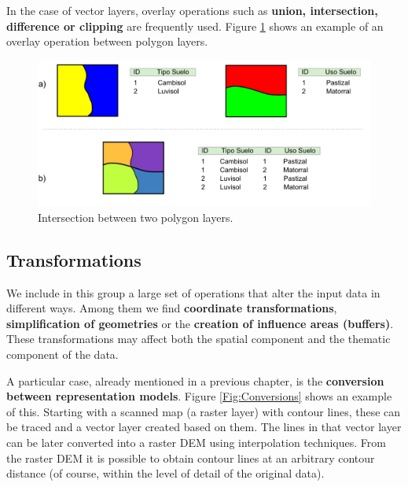 In the case of vector layers, overlay operations such as \textbf{union, intersection, difference or clipping} are frequently used. Figure \ref{Fig:Intersection} shows an example of an overlay operation between polygon layers.

\begin{figure}[!hbt]   
\centering
\includegraphics[width= \columnwidth]{Analysis/Intersection.pdf}
\caption{\small Intersection between two polygon layers.}
\label{Fig:Intersection} 
\end{figure}

\subsection{Transformations}

We include in this group a large set of operations that alter the input data in different ways. Among them we find \textbf{coordinate transformations}, \textbf{simplification of geometries} or the \textbf{creation of influence areas (buffers)}. These transformations may affect both the spatial component and the thematic component of the data. 

A particular case, already mentioned in a previous chapter, is the \textbf{conversion between representation models}. Figure \ref{Fig:Conversions} shows an example of this. Starting with a scanned map (a raster layer) with contour lines, these can be traced and a vector layer created based on them. The lines in that vector layer can be later converted into a raster DEM using interpolation techniques. From the raster DEM it is possible to obtain contour lines at an arbitrary contour distance (of course, within the level of detail of the original data).

